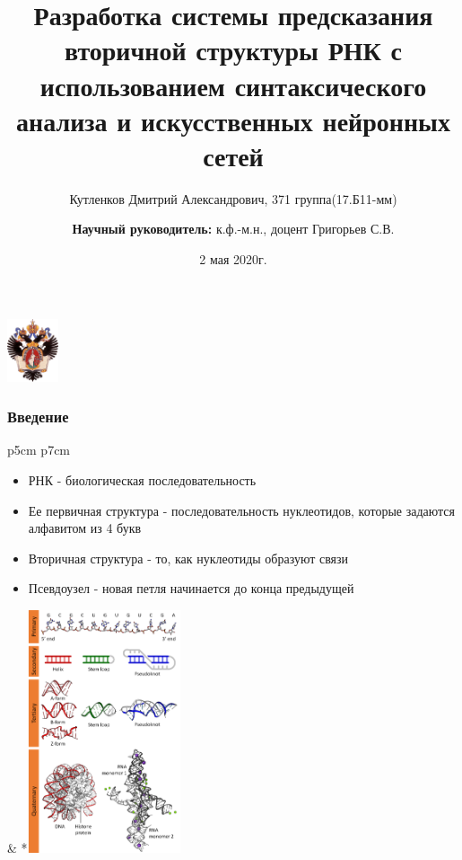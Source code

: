 \documentclass{beamer}
\title[]{Разработка системы предсказания вторичной структуры РНК с использованием синтаксического анализа и искусственных нейронных сетей}
\institute[СПбГУ]{
Санкт-Петербургский государственный университет \\
Кафедра системного программирования }
\author[Кутленков Дмитрий]{Кутленков Дмитрий Александрович, 371 группа(17.Б11-мм) \\
  \and  
    {\bfseries Научный руководитель:} к.ф.-м.н., доцент Григорьев С.В. \\ 
}
\date{2 мая 2020г.}
\begin{document}
{
\begin{frame}
  \begin{center}
  {\includegraphics[width=1.5cm]{pictures/SPbGU_Logo.png}}
  \end{center}
  \titlepage
\end{frame}
}

\begin{frame}[fragile]
  \transwipe[direction=90]
  \frametitle{Введение}
  
\begin{tabular}{p{5cm} p{7cm}}
	\begin{itemize}
		\item РНК - биологическая последовательность
		\item Ее первичная структура - последовательность нуклеотидов, которые задаются алфавитом из 4 букв
		\item Вторичная структура - то, как нуклеотиды образуют связи 
		\item Псевдоузел - новая петля начинается до конца предыдущей
  \end{itemize} &
*{\!\includegraphics[width=4.5cm]{../pics/DNA_RNA_structure_(full).png}}
\end{tabular}

\end{frame}
            
\end{document}
